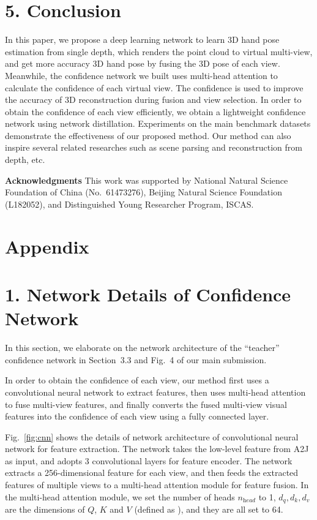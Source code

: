 \documentclass[letterpaper]{article} \usepackage{aaai22}  \usepackage{times}  \usepackage{helvet}  \usepackage{courier}  \usepackage[hyphens]{url}  \usepackage{graphicx} \urlstyle{rm} \def\UrlFont{\rm}  \usepackage{natbib}  \usepackage{caption} \DeclareCaptionStyle{ruled}{labelfont=normalfont,labelsep=colon,strut=off} \frenchspacing  \setlength{\pdfpagewidth}{8.5in}  \setlength{\pdfpageheight}{11in}  \usepackage{algorithm}
\begin{document}
\section{5. Conclusion}
In this paper, we propose a deep learning network to learn 3D hand pose estimation from single depth, which renders the point cloud to virtual multi-view, and get more accuracy 3D hand pose by fusing the 3D pose of each view. Meanwhile, the confidence network we built uses multi-head attention to calculate the confidence of each virtual view. The confidence is used to improve the accuracy of 3D reconstruction during fusion and view selection. In order to obtain the confidence of each view efficiently, we obtain a lightweight confidence network using network distillation. Experiments on the main benchmark datasets demonstrate the effectiveness of our proposed method. 
Our method can also inspire several related researches such as scene parsing and reconstruction from depth, etc.

\vspace{5mm}
\noindent \textbf{Acknowledgments} This work was supported by National Natural Science Foundation of China (No.~61473276), Beijing Natural Science Foundation (L182052), and Distinguished Young Researcher Program, ISCAS.


\newpage
\section*{Appendix}
\section{1. Network Details of Confidence Network}
In this section, we elaborate on the network architecture of the ``teacher'' confidence network in Section~3.3 and Fig.~4 of our main submission.

In order to obtain the confidence of each view, our method first uses a convolutional neural network to extract features, then uses multi-head attention \cite{vaswani2017attention} to fuse multi-view features, and finally converts the fused multi-view visual features into the confidence of each view using a fully connected layer. 

Fig.~\ref{fig:cnn} shows the details of network architecture of convolutional neural network for feature extraction. The network takes the low-level feature from A2J as input, and adopts 3 convolutional layers for feature encoder.
The network extracts a 256-dimensional feature for each view, and then feeds the extracted features of multiple views to a multi-head attention module \cite{vaswani2017attention} for feature fusion.
In the multi-head attention module, we 
set the number of heads $n_{\textit{head}}$ to 1, $d_q, d_k, d_v$ are the dimensions of $Q$, $K$ and $V$ (defined as \cite{vaswani2017attention}), and they are all set to 64. 
\end{document}
